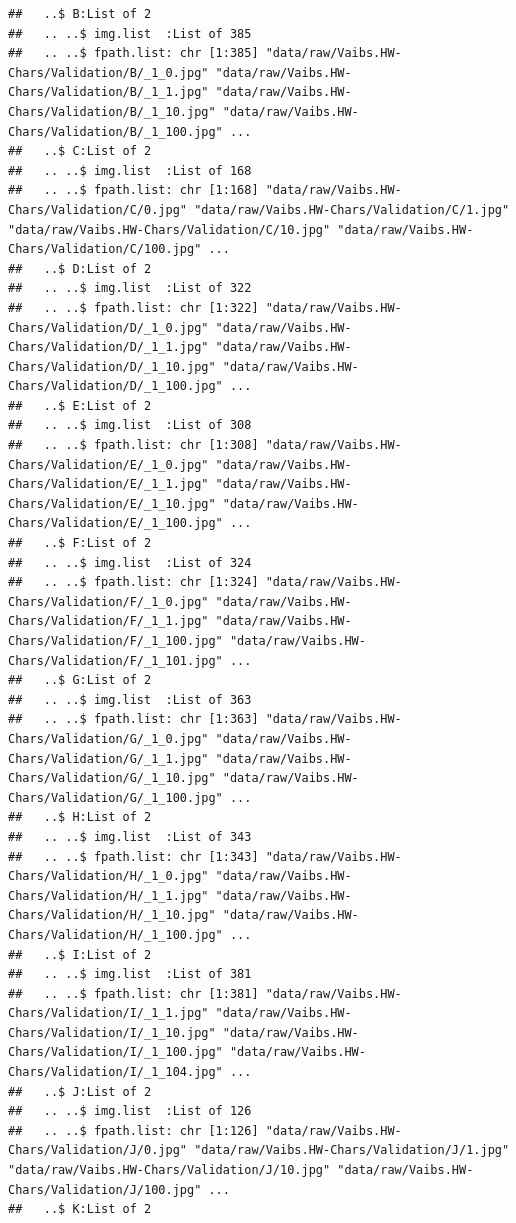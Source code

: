 \documentclass[
]{report}
\begin{document}
\begin{verbatim}
##   ..$ B:List of 2
##   .. ..$ img.list  :List of 385
##   .. ..$ fpath.list: chr [1:385] "data/raw/Vaibs.HW-Chars/Validation/B/_1_0.jpg" "data/raw/Vaibs.HW-Chars/Validation/B/_1_1.jpg" "data/raw/Vaibs.HW-Chars/Validation/B/_1_10.jpg" "data/raw/Vaibs.HW-Chars/Validation/B/_1_100.jpg" ...
##   ..$ C:List of 2
##   .. ..$ img.list  :List of 168
##   .. ..$ fpath.list: chr [1:168] "data/raw/Vaibs.HW-Chars/Validation/C/0.jpg" "data/raw/Vaibs.HW-Chars/Validation/C/1.jpg" "data/raw/Vaibs.HW-Chars/Validation/C/10.jpg" "data/raw/Vaibs.HW-Chars/Validation/C/100.jpg" ...
##   ..$ D:List of 2
##   .. ..$ img.list  :List of 322
##   .. ..$ fpath.list: chr [1:322] "data/raw/Vaibs.HW-Chars/Validation/D/_1_0.jpg" "data/raw/Vaibs.HW-Chars/Validation/D/_1_1.jpg" "data/raw/Vaibs.HW-Chars/Validation/D/_1_10.jpg" "data/raw/Vaibs.HW-Chars/Validation/D/_1_100.jpg" ...
##   ..$ E:List of 2
##   .. ..$ img.list  :List of 308
##   .. ..$ fpath.list: chr [1:308] "data/raw/Vaibs.HW-Chars/Validation/E/_1_0.jpg" "data/raw/Vaibs.HW-Chars/Validation/E/_1_1.jpg" "data/raw/Vaibs.HW-Chars/Validation/E/_1_10.jpg" "data/raw/Vaibs.HW-Chars/Validation/E/_1_100.jpg" ...
##   ..$ F:List of 2
##   .. ..$ img.list  :List of 324
##   .. ..$ fpath.list: chr [1:324] "data/raw/Vaibs.HW-Chars/Validation/F/_1_0.jpg" "data/raw/Vaibs.HW-Chars/Validation/F/_1_1.jpg" "data/raw/Vaibs.HW-Chars/Validation/F/_1_100.jpg" "data/raw/Vaibs.HW-Chars/Validation/F/_1_101.jpg" ...
##   ..$ G:List of 2
##   .. ..$ img.list  :List of 363
##   .. ..$ fpath.list: chr [1:363] "data/raw/Vaibs.HW-Chars/Validation/G/_1_0.jpg" "data/raw/Vaibs.HW-Chars/Validation/G/_1_1.jpg" "data/raw/Vaibs.HW-Chars/Validation/G/_1_10.jpg" "data/raw/Vaibs.HW-Chars/Validation/G/_1_100.jpg" ...
##   ..$ H:List of 2
##   .. ..$ img.list  :List of 343
##   .. ..$ fpath.list: chr [1:343] "data/raw/Vaibs.HW-Chars/Validation/H/_1_0.jpg" "data/raw/Vaibs.HW-Chars/Validation/H/_1_1.jpg" "data/raw/Vaibs.HW-Chars/Validation/H/_1_10.jpg" "data/raw/Vaibs.HW-Chars/Validation/H/_1_100.jpg" ...
##   ..$ I:List of 2
##   .. ..$ img.list  :List of 381
##   .. ..$ fpath.list: chr [1:381] "data/raw/Vaibs.HW-Chars/Validation/I/_1_1.jpg" "data/raw/Vaibs.HW-Chars/Validation/I/_1_10.jpg" "data/raw/Vaibs.HW-Chars/Validation/I/_1_100.jpg" "data/raw/Vaibs.HW-Chars/Validation/I/_1_104.jpg" ...
##   ..$ J:List of 2
##   .. ..$ img.list  :List of 126
##   .. ..$ fpath.list: chr [1:126] "data/raw/Vaibs.HW-Chars/Validation/J/0.jpg" "data/raw/Vaibs.HW-Chars/Validation/J/1.jpg" "data/raw/Vaibs.HW-Chars/Validation/J/10.jpg" "data/raw/Vaibs.HW-Chars/Validation/J/100.jpg" ...
##   ..$ K:List of 2

\end{verbatim}
\end{document}
